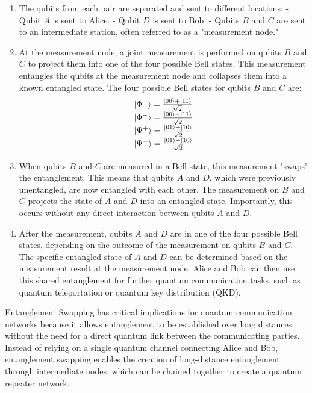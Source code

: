 \documentclass{article}
\begin{document}
	\begin{enumerate}
		\item The qubits from each pair are separated and sent to different locations:
		- Qubit \( A \) is sent to Alice.
		- Qubit \( D \) is sent to Bob.
		- Qubits \( B \) and \( C \) are sent to an intermediate station, often referred to as a "measurement node."

		\item  At the measurement node, a joint measurement is performed on qubits \( B \) and \( C \) to project them into one of the four possible Bell states. This measurement entangles the qubits at the measurement node and collapses them into a known entangled state. The four possible Bell states for qubits \( B \) and \( C \) are:
		\[
		\begin{array}{l}
			\ket{\Phi^+} = \frac{\ket{00} + \ket{11}}{\sqrt{2}} \\
			\ket{\Phi^-} = \frac{\ket{00} - \ket{11}}{\sqrt{2}} \\
			\ket{\Psi^+} = \frac{\ket{01} + \ket{10}}{\sqrt{2}} \\
			\ket{\Psi^-} = \frac{\ket{01} - \ket{10}}{\sqrt{2}}
		\end{array}
		\]

		\item When qubits \( B \) and \( C \) are measured in a Bell state, this measurement "swaps" the entanglement. This means that qubits \( A \) and \( D \), which were previously unentangled, are now entangled with each other. The measurement on \( B \) and \( C \) projects the state of \( A \) and \( D \) into an entangled state. Importantly, this occurs without any direct interaction between qubits \( A \) and \( D \).
		
		\item After the measurement, qubits \( A \) and \( D \) are in one of the four possible Bell states, depending on the outcome of the measurement on qubits \( B \) and \( C \). The specific entangled state of \( A \) and \( D \) can be determined based on the measurement result at the measurement node. Alice and Bob can then use this shared entanglement for further quantum communication tasks, such as quantum teleportation or quantum key distribution (QKD).
	\end{enumerate}

	Entanglement Swapping has critical implications for quantum communication networks because it allows entanglement to be established over long distances without the need for a direct quantum link between the communicating parties. Instead of relying on a single quantum channel connecting Alice and Bob, entanglement swapping enables the creation of long-distance entanglement through intermediate nodes, which can be chained together to create a quantum repeater network.
\end{document}
